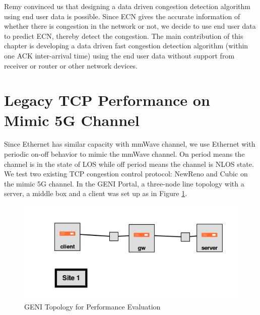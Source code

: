 \par Remy convinced us that designing a data driven congestion detection algorithm using end user data is possible. Since ECN gives the accurate information of whether there is congestion in the network or not, we decide to use end user data to predict ECN, thereby detect the congestion. The main contribution of this chapter is developing a data driven fast congestion detection algorithm (within one ACK inter-arrival time) using the end user data without support from receiver or router or other network devices.

\section{Legacy TCP Performance on Mimic 5G Channel}
\label{legacy}
\par Since Ethernet has similar capacity with mmWave channel, we use Ethernet with periodic on-off behavior to mimic the mmWave channel. On period means the channel is in the state of LOS while off period means the channel is NLOS state. We test two existing TCP congestion control protocol: NewReno and Cubic on the mimic 5G channel. In the GENI Portal, a three-node line topology with a server, a middle box and a client was set up as in Figure \ref{genitopo}. 
\begin{figure}
\centering
\includegraphics[width=14cm]{topologyGeni.png}
\caption{GENI Topology for Performance Evaluation}
\label{genitopo}
\end{figure}
